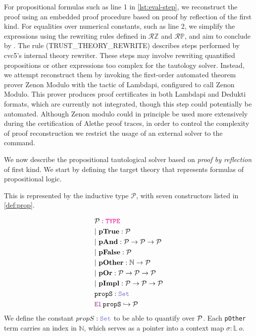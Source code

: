 For propositional formulas such as line 1 in \cref{lst:eval-step}, we reconstruct the proof using an embedded proof procedure based on proof by reflection of the first kind.
For equalities over numerical constants, such as line 2, we simplify the expressions using the rewriting rules defined in $\mathcal{R}{\mathbb{Z}}$ and $\mathcal{R}{\mathbb{P}}$, and aim to conclude by .
The rule  (TRUST\_THEORY\_REWRITE) describes steps performed by cvc5’s internal theory rewriter.
These steps may involve rewriting quantified propositions or other expressions too complex for the tautology solver.
Instead, we attempt reconstruct them by invoking the first-order automated theorem prover Zenon Modulo \cite{zenonmodulo} with the tactic  of Lambdapi, configured to call Zenon Modulo.
This prover produces proof certificates in both Lambdapi and Dedukti formats, which are currently not integrated,  though this step could potentially be automated.
Although Zenon modulo could in principle be used more extensively during the certification of Alethe proof traces, in order to control the complexity of proof reconstruction we restrict the usage of an external solver to the  command.

We now describe the propositional tautological solver based on \emph{proof by reflection} of first kind.
We start by defining the target theory that represents formulas of propositional logic.

\begin{definition}[$\cal{P}$]\label{def:prop}
This is represented by the inductive type $\mathcal{P}$, with seven constructors listed in \cref{def:prop}.

\begin{align*}
& \cal{P} : \type \\
& |~\textbf{pTrue} : \cal{P} \\
& |~\textbf{pAnd} : \cal{P} \ra \cal{P} \ra \cal{P} \\
& |~\textbf{pFalse} : \cal{P} \\
& |~\textbf{pOther} : \N \ra \cal{P} \\
& |~\textbf{pOr} : \cal{P} \ra \cal{P} \ra \cal{P} \\
& |~\textbf{pImpl} : \cal{P} \ra \cal{P} \ra \cal{P} \\
& \kw{propS}: \set \\
& \el\,\kw{propS} \re \cal{P}
\end{align*}
We define the constant $propS: \set$ to be able to quantify over $\cal{P}$.
Each \texttt{pOther} term carries an index in $\mathbb{N}$, which serves as a pointer into a context map $\sigma : \mathbb{L}~o$.
\end{definition}

